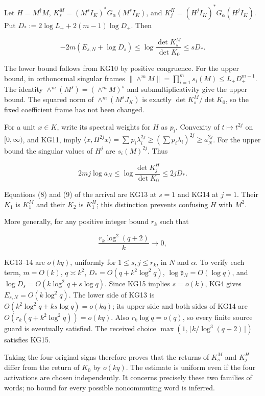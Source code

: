 \documentclass[11pt]{article}
\begin{document}
Let \(H=M^\dagger M\), \(K_s^M=(M^sI_K)^*G_\alpha(M^sI_K)\), and \(K_j^H=(H^jI_K)^*G_\alpha(H^jI_K)\). Put \(D_*:=2\log L_++2(m-1)\log D_+\). Then

\[
\boxed{-2m(E_{s,N}+\log D_s)
\le\log\frac{\det K_s^M}{\det K_0}\le sD_*.}
\tag{KG13}
\]

The lower bound follows from KG10 by positive congruence. For the upper bound, in orthonormal singular frames \(\|\wedge^mM\|=\prod_{i=1}^ms_i(M)\le L_+D_+^{m-1}\). The identity \(\wedge^m(M^s)=(\wedge^m M)^s\) and submultiplicativity give the upper bound. The squared norm of \(\wedge^m(M^sJ_K)\) is exactly \(\det K_s^M/\det K_0\), so the fixed coefficient frame has not been changed.

For a unit \(x\in K\), write its spectral weights for \(H\) as \(p_i\). Convexity of \(t\mapsto t^{2j}\) on \([0,\infty)\), and KG11, imply \(\langle x,H^{2j}x\rangle=\sum p_i\lambda_i^{2j}\ge(\sum p_i\lambda_i)^{2j}\ge a_N^{2j}\). For the upper bound the singular values of \(H^j\) are \(s_i(M)^{2j}\). Thus

\[
\boxed{2mj\log a_N\le\log\frac{\det K_j^H}{\det K_0}\le2jD_*.}
\tag{KG14}
\]

Equations (8) and (9) of the arrival are KG13 at \(s=1\) and KG14 at \(j=1\). Their \(K_1\) is \(K_1^M\) and their \(K_2\) is \(K_1^H\); this distinction prevents confusing \(H\) with \(M^2\).

More generally, for any positive integer bound \(r_k\) such that

\[
\frac{r_k\log^2(q+2)}{k}\longrightarrow0,
\tag{KG15}
\]

KG13--14 are \(o(kq)\), uniformly for \(1\le s,j\le r_k\), in \(N\) and \(\alpha\). To verify each term, \(m=O(k)\), \(q\asymp k^2\), \(D_*=O(q+k^2\log^2q)\), \(\log\mathfrak d_N=O(\log q)\), and \(\log D_s=O(k\log^2q+s\log q)\). Since KG15 implies \(s=o(k)\), KG4 gives \(E_{s,N}=O(k\log^2q)\). The lower side of KG13 is \(O(k^2\log^2q+ks\log q)=o(kq)\); its upper side and both sides of KG14 are \(O(r_k(q+k^2\log^2q))=o(kq)\). Also \(r_k\log q=o(q)\), so every finite source guard is eventually satisfied. The received choice \(\max(1,\lfloor k/\log^3(q+2)\rfloor)\) satisfies KG15.

Taking the four original signs therefore proves that the returns of \(K_s^M\) and \(K_j^H\) differ from the return of \(K_0\) by \(o(kq)\). The estimate is uniform even if the four activations are chosen independently. It concerns precisely these two families of words; no bound for every possible noncommuting word is inferred.
\end{document}
